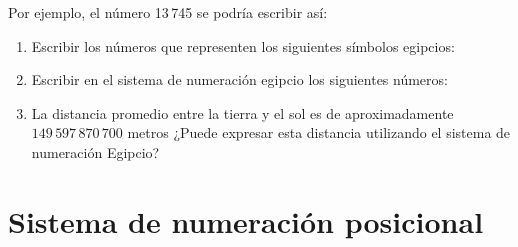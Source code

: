 \documentclass[12pt]{article}
\begin{document}
Por ejemplo, el número 13\,745 se podría escribir así:


\begin{enumerate}

    \item Escribir los números que representen los siguientes símbolos
        egipcios:


    \item Escribir en el sistema de numeración egipcio los siguientes números:


    \item La distancia promedio entre la tierra y el sol es de aproximadamente
        $149\,597\,870\,700$ metros ¿Puede expresar esta distancia utilizando
        el sistema de numeración Egipcio?

\end{enumerate}

\section{Sistema de numeración posicional}
\end{document}
